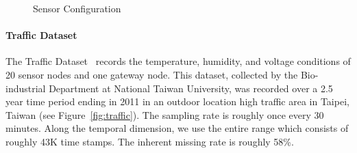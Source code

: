 \begin{figure}[h]
\centering
{}
\hspace{0.5cm}
\caption{Sensor Configuration}
\end{figure}


\paragraph*{Traffic Dataset}

The Traffic Dataset~\cite{liu2011developed} records the temperature, humidity, and voltage conditions of 20 sensor nodes and one gateway node.
This dataset, collected by the Bio-industrial Department at National Taiwan University, was recorded over a 2.5 year time period ending in 2011 in an outdoor location high traffic area in Taipei, Taiwan (see Figure~\ref{fig:traffic}).
The sampling rate is roughly once every 30 minutes.
Along the temporal dimension, we use the entire range which consists of roughly 43K time stamps.
The inherent missing rate is roughly 58\%.


